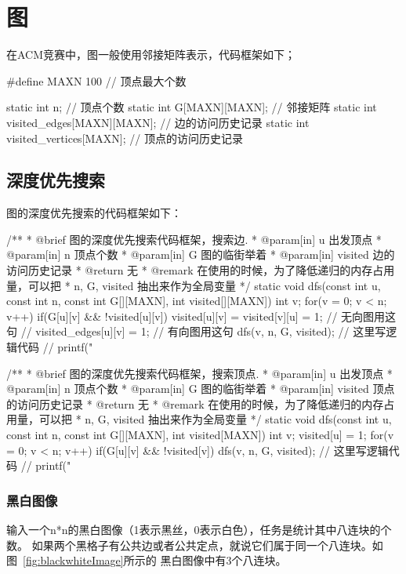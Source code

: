 \chapter{图}
在ACM竞赛中，图一般使用邻接矩阵表示，代码框架如下；

\begin{Codex}[label=graph.cpp ]
#define MAXN 100  // 顶点最大个数

static int n; // 顶点个数
static int G[MAXN][MAXN]; // 邻接矩阵
static int visited_edges[MAXN][MAXN]; // 边的访问历史记录
static int visited_vertices[MAXN]; // 顶点的访问历史记录
\end{Codex}

\section{深度优先搜索} %
图的深度优先搜索的代码框架如下：

\begin{Codex}[label=graph.cpp]
/**
 * @brief 图的深度优先搜索代码框架，搜索边.
 * @param[in] u 出发顶点
 * @param[in] n 顶点个数
 * @param[in] G 图的临街举着
 * @param[in] visited 边的访问历史记录
 * @return 无
 * @remark 在使用的时候，为了降低递归的内存占用量，可以把
 * n, G, visited 抽出来作为全局变量
 */
static void dfs(const int u, 
                const int n, const int G[][MAXN], int visited[][MAXN]) {
    int v;
    for(v = 0;  v < n; v++) if(G[u][v] && !visited[u][v]) {
        visited[u][v] = visited[v][u] = 1; // 无向图用这句
        // visited_edges[u][v] = 1; // 有向图用这句
        dfs(v, n, G, visited);
        // 这里写逻辑代码
        // printf("%
    }
}

/**
 * @brief 图的深度优先搜索代码框架，搜索顶点.
 * @param[in] u 出发顶点
 * @param[in] n 顶点个数
 * @param[in] G 图的临街举着
 * @param[in] visited 顶点的访问历史记录
 * @return 无
 * @remark 在使用的时候，为了降低递归的内存占用量，可以把
 * n, G, visited 抽出来作为全局变量
 */
static void dfs(const int u, 
                const int n, const int G[][MAXN], int visited[MAXN]) {  
    int v;
    visited[u] = 1;
    for(v = 0;  v < n; v++) if(G[u][v] && !visited[v]) {
        dfs(v, n, G, visited);
        // 这里写逻辑代码
        // printf("%
    }
}
\end{Codex}

\subsection{黑白图像}
输入一个n*n的黑白图像（1表示黑丝，0表示白色），任务是统计其中八连块的个数。
如果两个黑格子有公共边或者公共定点，就说它们属于同一个八连块。如图~\ref{fig:blackwhiteImage}所示的
黑白图像中有3个八连块。


